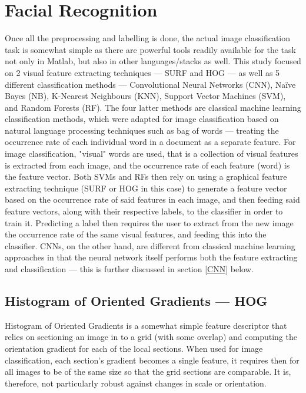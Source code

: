 \documentclass[11pt]{article}
\begin{document}
\section{Facial Recognition}\label{sec:facial_recognition}
    Once all the preprocessing and labelling is done, the actual image classification task is somewhat simple as there are powerful tools readily available for the task not only in Matlab, but also in other languages/stacks as well. This study focused on 2 visual feature extracting techniques --- SURF and HOG --- as well as 5 different classification methods --- Convolutional Neural Networks (CNN), Naïve Bayes (NB), K-Nearest Neighbours (KNN), Support Vector Machines (SVM), and Random Forests (RF). The four latter methods are classical machine learning classification methods, which were adapted for image classification based on natural language processing techniques such as bag of words --- treating the occurrence rate of each individual word in a document as a separate feature. For image classification, "visual" words are used, that is a collection of visual features is extracted from each image, and the occurrence rate of each feature (word) is the feature vector. Both SVMs and RFs then rely on using a graphical feature extracting technique (SURF or HOG in this case) to generate a feature vector based on the occurrence rate of said features in each image, and then feeding said feature vectors, along with their respective labels, to the classifier in order to train it. Predicting a label then requires the user to extract from the new image the occurrence rate of the same visual features, and feeding this into the classifier. CNNs, on the other hand, are different from classical machine learning approaches in that the neural network itself performs both the feature extracting and classification --- this is further discussed in section \ref{CNN} below.

    \subsection{Histogram of Oriented Gradients --- HOG}
        Histogram of Oriented Gradients is a somewhat simple feature descriptor that relies on sectioning an image in to a grid (with some overlap) and computing the orientation gradient for each of the local sections. When used for image classification, each section's gradient becomes a single feature, it requires then for all images to be of the same size so that the grid sections are comparable. It is, therefore, not particularly robust against changes in scale or orientation.
\end{document}
